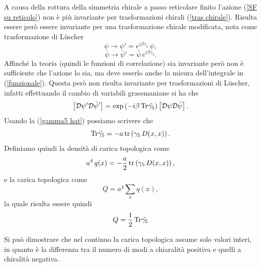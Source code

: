 \documentclass{article}
\numberwithin{equation}{subsection}
\begin{document}
A causa della rottura della simmetria chirale a passo reticolare finito l'azione (\ref{SF su reticolo}) non è più invariante per trasformazioni chirali (\ref{tras chirale}). Risulta essere però essere invariante per una trasformazione chirale modificata, nota come trasformazione di Lüscher
\begin{equation}
    \psi\rightarrow \psi'=e^{i\beta \hat{\gamma_5}}\,\psi,
\end{equation}
\begin{equation}
    \bar{\psi}\rightarrow\bar{\psi}'=\bar{\psi}\,e^{i\beta\gamma_5}.
\end{equation}
Affinché la teoria (quindi le funzioni di correlazione) sia invariante però non è sufficiente che l'azione lo sia, ma deve esserlo anche la misura dell'integrale in (\ref{funzionale}). Questa però non risulta invariante per trasformazioni di Lüscher, infatti effettuando il cambio di variabili grassmaniane si ha che 
\begin{equation}
    \left[\mathcal{D}\psi' \mathcal{D}\bar{\psi}'\right]=\exp\left(-i\beta\,\textup{Tr}\hat{\gamma_5}\right)\left[\mathcal{D}\psi \mathcal{D}\bar{\psi}\right].
\end{equation}
Usando la (\ref{gamma5 hat}) possiamo scrivere che 
\begin{equation}
    \textup{Tr}\hat{\gamma_5}=-a\,\textup{tr}\left(\gamma_5\,D(x,x)\right).
\end{equation}
Definiamo quindi la densità di carica topologica come
\begin{equation}
    \label{top charge density}
    a^4\,q(x)=-\frac{a}{2}\,\textup{tr}\left(\gamma_5\,D(x,x)\right),
\end{equation}
e la carica topologica come 
\begin{equation}
    \label{top charge}
    Q=a^4\sum_x q(x), 
\end{equation}
la quale risulta essere quindi 
\begin{equation}
    Q=\frac{1}{2}\,\textup{Tr}\hat{\gamma_5}
\end{equation}

Si può dimostrare che nel continuo la carica topologica assume solo valori interi, in quanto è la differenza tra il numero di modi a chiaralità positiva e quelli a chiralità negativa.
\end{document}
